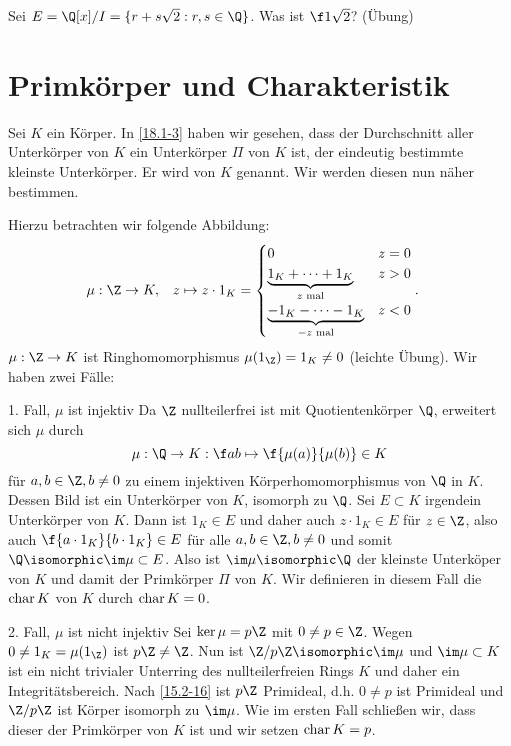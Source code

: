 \begin{note}
	Sei $E = \Q[x] / I = \{ r + s \sqrt 2 : r,s \in \Q \}$.
	Was ist $\f 1{\sqrt 2}$? (Übung)
\end{note}


\section{Primkörper und Charakteristik} \label{sec:18.2}


Sei $K$ ein Körper.
In \ref{18.1-3} haben wir gesehen, dass der Durchschnitt aller Unterkörper von $K$ ein Unterkörper $\Pi$ von $K$ ist, der eindeutig bestimmte kleinste Unterkörper.
Er wird  von $K$ genannt.
Wir werden diesen nun näher bestimmen.

Hierzu betrachten wir folgende Abbildung:
\begin{align*}
	\mu: \Z &\to K, &
	z &\mapsto z \cdot 1_K = \begin{cases}
		0 & z = 0 \\
		\underbrace{1_K + \dotsb + 1_K}_{\text{$z$ mal}} & z > 0 \\
		\underbrace{-1_K - \dotsb - 1_K}_{\text{$-z$ mal}} & z < 0
	\end{cases}.
\end{align*}
$\mu: \Z \to K$ ist Ringhomomorphismus $\mu(1_\Z) = 1_K \neq 0$ (leichte Übung).
Wir haben zwei Fälle:
\begin{seg}{1. Fall, $\mu$ ist injektiv}
	Da $\Z$ nullteilerfrei ist mit Quotientenkörper $\Q$, erweitert sich $\mu$ durch
	\[
		\mu: \Q \to K:
		\f ab \mapsto \f{\mu(a)}{\mu(b)} \in K
	\]
	für $a,b \in \Z, b \neq 0$ zu einem injektiven Körperhomomorphismus von $\Q$ in $K$.
	Dessen Bild ist ein Unterkörper von $K$, isomorph zu $\Q$.
	Sei $E \subset K$ irgendein Unterkörper von $K$.
	Dann ist $1_K \in E$ und daher auch $z \cdot 1_K \in E$ für $z \in \Z$, also auch $\f {a \cdot 1_K}{b \cdot 1_K} \in E$ für alle $a, b \in \Z, b \neq 0$ und somit $\Q \isomorphic \im \mu \subset E$.
	Also ist $\im \mu \isomorphic \Q$ der kleinste Unterköper von $K$ und damit der Primkörper $\Pi$ von $K$.
	Wir definieren in diesem Fall die  $\operatorname{char} K$ von $K$ durch $\operatorname{char} K = 0$.
\end{seg}
\begin{seg}{2. Fall, $\mu$ ist nicht injektiv}
	Sei $\ker \mu = p\Z$ mit $0 \neq p \in \Z$.
	Wegen $0 \neq 1_K = \mu(1_\Z)$ ist $p\Z \neq \Z$.
	Nun ist $\Z / p\Z \isomorphic \im \mu$ und $\im \mu \subset K$ ist ein nicht trivialer Unterring des nullteilerfreien Rings $K$ und daher ein Integritätsbereich.
	Nach \ref{15.2-16} ist $p\Z$ Primideal, d.h. $0 \neq p$ ist Primideal und $\Z / p \Z$ ist Körper isomorph zu $\im \mu$.
	Wie im ersten Fall schließen wir, dass dieser der Primkörper von $K$ ist und wir setzen $\operatorname{char} K = p$.
\end{seg}


